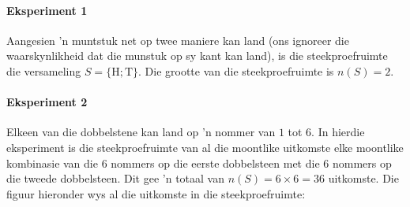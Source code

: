 \paragraph{Eksperiment 1} Aangesien 'n muntstuk net op twee maniere kan land (ons ignoreer die waarskynlikheid dat die munstuk op sy kant kan land),  is die steekproefruimte die versameling \(S=\{\mbox{H}; \mbox{T}\}\). Die grootte van die steekproefruimte is \(n(S)=2\).

\begin{figure}[H]
  \begin{center}
  \end{center}
\end{figure}

\paragraph{Eksperiment 2} Elkeen van die dobbelstene kan land op 'n nommer van $1$ tot $6$. In hierdie eksperiment is die steekproefruimte van al die moontlike uitkomste elke moontlike kombinasie van die $6$ nommers op die eerste dobbelsteen met die $6$ nommers op die tweede dobbelsteen. Dit gee 'n totaal van \(n(S) = 6 \times 6
= 36\) uitkomste. Die figuur hieronder wys al die uitkomste in die steekproefruimte:

\begin{figure}[h]
\begin{center}
\end{center}
\end{figure}

